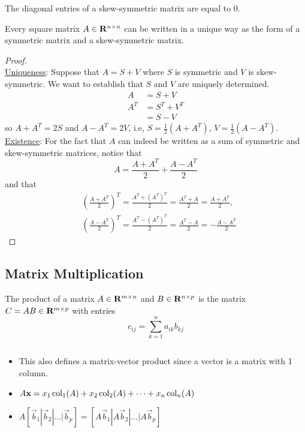 \documentclass{article}
\begin{document}
	\begin{remark}
		The diagonal entries of a skew-symmetric matrix are equal to 0.
	\end{remark}

	\begin{thm}
		Every square matrix $ A \in \mathbf{R}^{n \times n} $ can be written in a unique way as the form of a symmetric matrix and a skew-symmetric matrix.
	\end{thm}

	\begin{proof} $ $ \vspace{2mm}\\
		\underline{Uniqueness}: Suppose that $ A = S+V $ where $ S $ is symmetric and $ V $ is skew-symmetric. We want to establish that $ S $ and $ V $ are uniquely determined.
		\begin{align*}
			A &= S+V \\
			A^T &= S^T + V^T \\
				&= S-V
		\end{align*}
		so $ A+A^T = 2S $ and $ A-A^T = 2V $, i.e, $ S = \frac{1}{2}(A+A^T) $, $ V = \frac{1}{2}(A-A^T) $. \\
		
		\underline{Existence}: For the fact that $ A $ can indeed be written as a sum of symmetric and skew-symmetric matrices, notice that
		\[
			A = \frac{A+A^T}{2} + \frac{A-A^T}{2}
		\]
		and that 
		\begin{align*}
			&\left( \frac{A + A^T}{2} \right)^T = \frac{A^T + (A^T)^T}{2} = \frac{A^T + A}{2} = \frac{A + A^T}{2}, \\
			&\left( \frac{A - A^T}{2} \right)^T = \frac{A^T - (A^T)^T}{2} = \frac{A^T - A}{2} = -\frac{A-A^T}{2}
		\end{align*}
	\end{proof}

	\subsection{Matrix Multiplication}
	
	The product of a matrix $ A \in \mathbf{R}^{m \times n} $ and $ B \in \mathbf{R}^{n \times p} $ is the matrix $ C = AB \in \mathbf{R}^{m \times p} $ with entries
	\[
		c_{ij} = \sum\limits_{k=1}^{n} a_{ik} b_{kj}
	\]
	
	\begin{remark} $  $ \vspace{1mm}
		\begin{itemize}
			\item This also defines a matrix-vector product since a vector is a matrix with 1 column.
			\item $ A\mathbf{x} = x_1 \operatorname{col}_1(A) + x_2 \operatorname{col}_2(A) + \dots + x_n \operatorname{col}_n(A) $
			\item $ A[\vec{b}_1 | \vec{b}_2 | \dots | \vec{b}_p] = [A\vec{b}_1 | A\vec{b}_2 | \dots | A\vec{b}_p] $
		\end{itemize}
	\end{remark}
\end{document}
